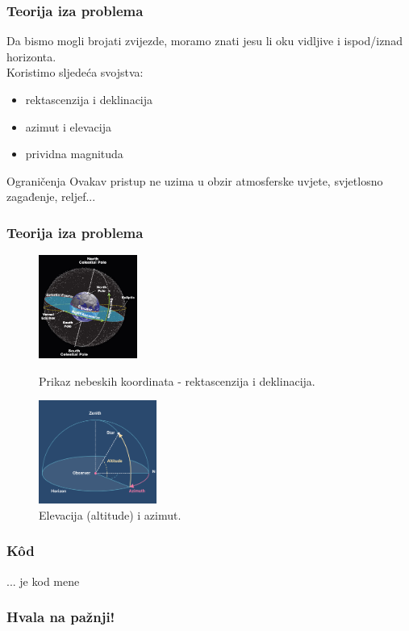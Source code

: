 \begin{frame}
  \frametitle{Teorija iza problema}
  Da bismo mogli brojati zvijezde, moramo znati jesu li oku vidljive i ispod/iznad horizonta.\\ \pause
  Koristimo sljedeća svojstva:
  \begin{itemize}
    \item rektascenzija i deklinacija
    \item azimut i elevacija
    \item prividna magnituda
  \end{itemize}
  \pause
  \medskip
  \begin{alertblock}{Ograničenja}
    Ovakav pristup ne uzima u obzir atmosferske uvjete, svjetlosno zagađenje, reljef...
  \end{alertblock}
\end{frame}

\begin{frame}
  \frametitle{Teorija iza problema}
  \begin{figure}[h]
    \begin{minipage}[t]{0.43\linewidth}
      \centering
      \includegraphics[height=128px]{assets/ext-ra_de.jpg}
      \caption{Prikaz nebeskih koordinata - rektascenzija i deklinacija.}\label{fig:ra_de}
    \end{minipage}
    \begin{minipage}[t]{0.55\linewidth}
      \centering
      \includegraphics[height=128px]{assets/ext_el-as.png}
      \caption{Elevacija (altitude) i azimut.}\label{fig:el_as}
    \end{minipage}
  \end{figure}
\end{frame}

\begin{frame}
  \frametitle{Kôd}
  \pause ... je kod mene
\end{frame}

\begin{frame}
  \frametitle{Hvala na pažnji!}
\end{frame}

